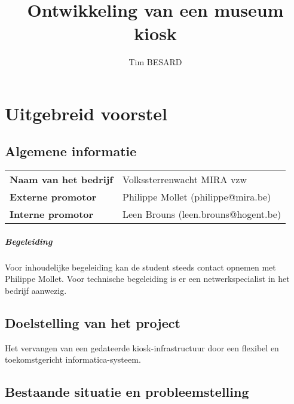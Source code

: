 \documentclass[a4paper,oneside,11pt,final]{memoir}
\title{Ontwikkeling van een museum kiosk}
\author{Tim BESARD}
\begin{document}
\maketitle
{}
{}


%
%

\chapter{Uitgebreid voorstel}

\section{Algemene informatie}

\begin{tabular}{| l l |}
	\hline
	\textbf{Naam van het bedrijf} & Volkssterrenwacht MIRA vzw \\
	\textbf{Externe promotor} & Philippe Mollet (philippe@mira.be) \\
	\textbf{Interne promotor} & Leen Brouns (leen.brouns@hogent.be) \\
	\hline
\end{tabular}

\paragraph{Begeleiding} Voor inhoudelijke begeleiding kan de student steeds contact opnemen met Philippe Mollet. Voor technische begeleiding is er een netwerkspecialist in het bedrijf aanwezig.


\section{Doelstelling van het project}

Het vervangen van een gedateerde kiosk-infrastructuur door een flexibel en toekomstgericht informatica-systeem.


\section{Bestaande situatie en probleemstelling}
\end{document}
